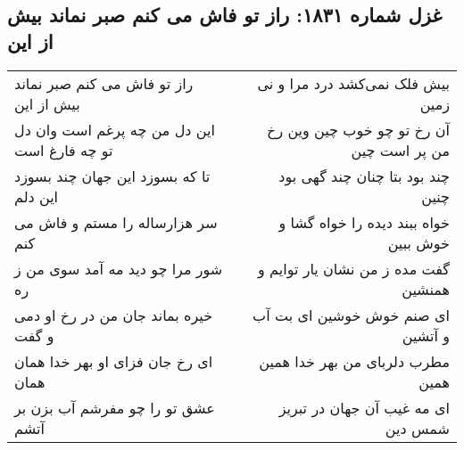 \begin{center}
\section*{غزل شماره ۱۸۳۱: راز تو فاش می کنم صبر نماند بیش از این}
\label{sec:1831}
\begin{longtable}{l p{0.5cm} r}
راز تو فاش می کنم صبر نماند بیش از این
&&
بیش فلک نمی‌کشد درد مرا و نی زمین
\\
این دل من چه پرغم است وان دل تو چه فارغ است
&&
آن رخ تو چو خوب چین وین رخ من پر است چین
\\
تا که بسوزد این جهان چند بسوزد این دلم
&&
چند بود بتا چنان چند گهی بود چنین
\\
سر هزارساله را مستم و فاش می کنم
&&
خواه ببند دیده را خواه گشا و خوش ببین
\\
شور مرا چو دید مه آمد سوی من ز ره
&&
گفت مده ز من نشان یار توایم و همنشین
\\
خیره بماند جان من در رخ او دمی و گفت
&&
ای صنم خوش خوشین ای بت آب و آتشین
\\
ای رخ جان فزای او بهر خدا همان همان
&&
مطرب دلربای من بهر خدا همین همین
\\
عشق تو را چو مفرشم آب بزن بر آتشم
&&
ای مه غیب آن جهان در تبریز شمس دین
\\
\end{longtable}
\end{center}
